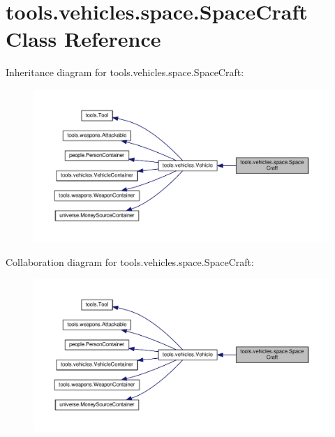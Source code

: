 \hypertarget{classtools_1_1vehicles_1_1space_1_1_space_craft}{}\section{tools.\+vehicles.\+space.\+Space\+Craft Class Reference}
\label{classtools_1_1vehicles_1_1space_1_1_space_craft}


Inheritance diagram for tools.\+vehicles.\+space.\+Space\+Craft\+:\nopagebreak
\begin{figure}[H]
\begin{center}
\leavevmode
\includegraphics[width=350pt]{classtools_1_1vehicles_1_1space_1_1_space_craft__inherit__graph}
\end{center}
\end{figure}


Collaboration diagram for tools.\+vehicles.\+space.\+Space\+Craft\+:\nopagebreak
\begin{figure}[H]
\begin{center}
\leavevmode
\includegraphics[width=350pt]{classtools_1_1vehicles_1_1space_1_1_space_craft__coll__graph}
\end{center}
\end{figure}
